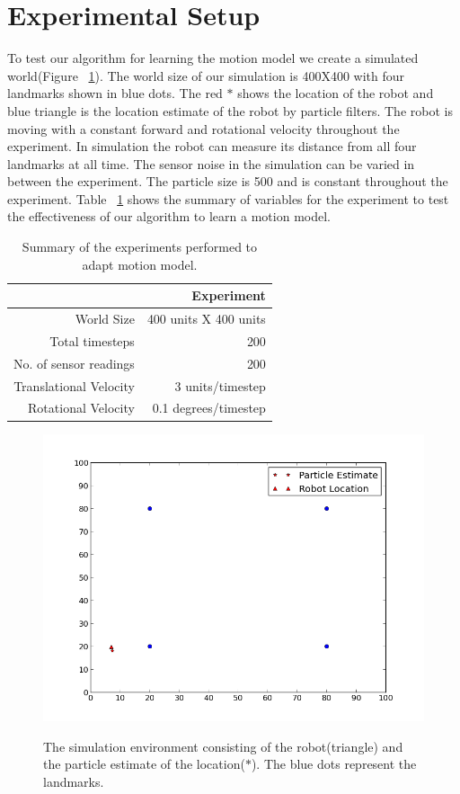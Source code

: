 \documentclass[12pt]{dalcsthesis}
\begin{document}
\section{Experimental Setup}
To test our algorithm for learning the motion model we create a simulated world(Figure ~\ref{fig-: simulation world}). The world size of our simulation is 400X400 with four landmarks shown in blue dots. The red $\ast$ shows the location of the robot and blue triangle is the location estimate of the  robot by particle filters. The robot is moving with a constant forward and rotational velocity throughout the experiment. In simulation the robot can measure its distance from all four landmarks at all time. The sensor noise in the simulation can be varied in between the experiment. The particle size is 500 and is constant throughout the experiment. Table ~\ref{tab-constant parameters} shows the summary of variables for the experiment to test the effectiveness of our algorithm to learn a motion model.
\begin{table}[tbh]
\centering
\begin{tabular}{|r|r|}
    \hline
    & Experiment \\
    \hline \hline
    World Size & 400 units X 400 units\\
    \hline
    Total timesteps & 200  \\
    \hline
    No. of sensor readings & 200 \\
    \hline
    Translational Velocity & 3 units/timestep \\
    \hline
    Rotational Velocity & 0.1 degrees/timestep \\
    \hline
\end{tabular}
 \caption{\label{tab-constant parameters}Summary of the experiments performed to adapt motion model.}
\end{table}

\begin{figure}
  \centering
     {\includegraphics[height = 3.0 in]{0.png}}
  \caption{\label{fig-: simulation world}The simulation environment consisting of the robot(triangle) and the particle estimate of the location($\ast$). The blue dots represent the landmarks.}
\end{figure}
\end{document}
